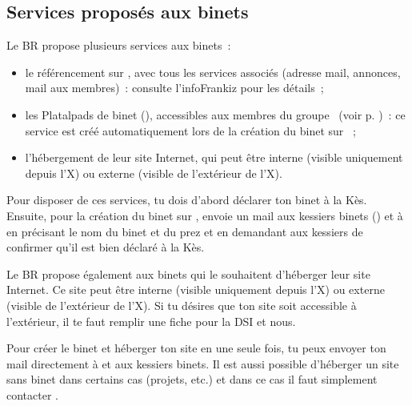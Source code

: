 \subsection{Services proposés aux binets}

Le BR propose plusieurs services aux binets~:
\begin{itemize}
\item le référencement sur \fkz, avec tous les services associés (adresse mail, annonces, mail aux membres)~: consulte l'infoFrankiz pour les détails~;
\item les Platalpads de binet (), accessibles aux membres du groupe \fkz\ (voir p. \pageref{platalpad})~: ce service est créé automatiquement lors de la création du binet sur \fkz~;
\item l'hébergement de leur site Internet, qui peut être interne (visible uniquement depuis l'X) ou externe (visible de l'extérieur de l'X).\\
\end{itemize}

Pour disposer de ces services, tu dois d'abord déclarer ton binet à la Kès. Ensuite, pour la création du binet sur \fkz,
envoie un mail aux kessiers binets () et à  en précisant le nom du binet et du prez et en demandant aux kessiers de confirmer qu'il est bien déclaré à la Kès.

\vspace{4mm}
Le BR propose également aux binets qui le souhaitent d'héberger leur site Internet. Ce site peut être interne (visible uniquement depuis l'X) ou externe (visible de l'extérieur de l'X). Si tu désires que ton site soit accessible à l'extérieur, il te faut remplir une fiche pour la DSI et nous.

Pour créer le binet et héberger ton site en une seule fois, tu peux envoyer ton mail directement à  et aux kessiers binets.
Il est aussi possible d'héberger un site sans binet dans certains cas (projets, etc.) et dans ce cas il faut simplement contacter .

